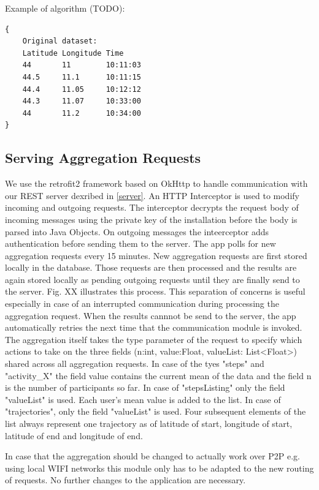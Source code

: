 Example of algorithm (TODO):
\begin{verbatim}
{
	Original dataset:			
	Latitude Longitude Time
	44		 11		   10:11:03
	44.5	 11.1	   10:11:15
	44.4	 11.05	   10:12:12
	44.3	 11.07	   10:33:00
	44	     11.2	   10:34:00
}
\end{verbatim}

\subsection{Serving Aggregation Requests}
We use the retrofit2 framework \parencite{retrofit} based on OkHttp \parencite{okhttp} to handle communication with our REST server dexribed in \ref{server}. An HTTP Interceptor is used to modify incoming and outgoing requests. The interceptor decrypts the request body of incoming messages using the private key of the installation before the body is parsed into Java Objects. On outgoing messages the inteerceptor adds authentication before sending them to the server.
The app polls for new aggregation requests every 15 minutes. New aggregation requests are first stored locally in the database. Those requests are then processed and the results are again stored locally as pending outgoing requests until they are finally send to the server. Fig. XX illustrates this process. This separation of concerns is useful especially in case of an interrupted communication during processing the aggregation request. When the results cannnot be send to the server, the app automatically retries the next time that the communication module is invoked.
The aggregation itself takes the type parameter of the request to specify which actions to take on the three fields (n:int, value:Float, valueList: List<Float>) shared across all aggregation requests. In case of the tyes "steps" and "activity\_X" the field value contains the current mean of the data and the field n is the number of participants so far. In case of "stepsListing" only the field "valueList" is used. Each user's mean value is added to the list. In case of "trajectories", only the field "valueList" is used. Four subsequent elements of the list always represent one trajectory as of latitude of start, longitude of start, latitude of end and longitude of end.

In case that the aggregation should be changed to actually work over P2P e.g. using local WIFI networks this module only has to be adapted to the new routing of requests. No further changes to the application are necessary.

